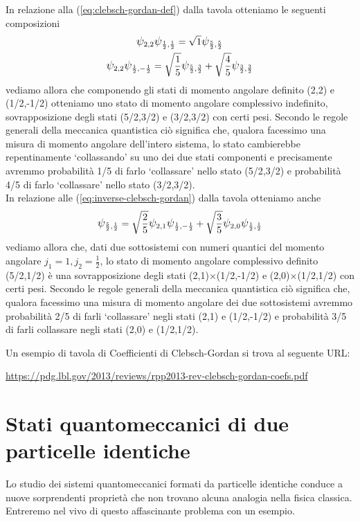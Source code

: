 In relazione alla (\ref{eq:clebsch-gordan-def}) dalla tavola otteniamo le seguenti composizioni
\begin{gather*}
    \mathlarger{\psi}_{2,2}\mathlarger{\psi}_{\frac{1}{2}, \frac{1}{2}} = \sqrt{ 1 } \mathlarger{\psi}_{\frac{5}{2}, \frac{5}{2}}\\
    \mathlarger{\psi}_{2,2}\mathlarger{\psi}_{\frac{1}{2},- \frac{1}{2}} = \sqrt{ \frac{1}{5} } \mathlarger{\psi}_{\frac{5}{2}, \frac{3}{2}} + \sqrt{ \frac{4}{5} } \mathlarger{\psi}_{\frac{3}{2}, \frac{3}{2}}
\end{gather*}
vediamo allora che componendo gli stati di momento angolare definito (2,2) e (1/2,-1/2) otteniamo uno stato di momento angolare complessivo indefinito, sovrapposizione degli stati (5/2,3/2) e (3/2,3/2) con certi pesi.
Secondo le regole generali della meccanica quantistica ciò significa che, qualora facessimo una misura di momento angolare dell’intero sistema,
lo stato cambierebbe repentinamente ‘collassando’ su uno dei due stati componenti e precisamente avremmo probabilità 1/5 di
farlo ‘collassare’ nello stato (5/2,3/2) e probabilità 4/5 di farlo ‘collassare’ nello stato (3/2,3/2). \\
In relazione alle (\ref{eq:inverse-clebsch-gordan}) dalla tavola otteniamo anche
\[
\mathlarger{\psi}_{\frac{5}{2}, \frac{1}{2}} = \sqrt{ \frac{2}{5} } \mathlarger{\psi}_{2,1}\mathlarger{\psi}_{\frac{1}{2}, - \frac{1}{2}} + \sqrt{ \frac{3}{5} } \mathlarger{\psi}_{2,0}\mathlarger{\psi}_{\frac{1}{2}, \frac{1}{2}}
\]
vediamo allora che, dati due sottosistemi con numeri quantici del momento angolare $j_{1}=1, j_{2}=\frac{1}{2}$, lo stato di momento angolare complessivo definito (5/2,1/2) è una sovrapposizione degli stati (2,1)$\times$(1/2,-1/2) e (2,0)$\times$(1/2,1/2) con certi pesi.
Secondo le regole generali della meccanica quantistica ciò significa che, qualora facessimo una misura di momento angolare dei due sottosistemi avremmo probabilità 2/5 di farli ‘collassare’ negli stati (2,1) e (1/2,-1/2) e probabilità 3/5 di farli collassare negli stati (2,0) e (1/2,1/2).
\bigskip

Un esempio di tavola di Coefficienti di Clebsch-Gordan si trova al seguente URL:
\begin{center}
    \url{https://pdg.lbl.gov/2013/reviews/rpp2013-rev-clebsch-gordan-coefs.pdf}
\end{center}

\section{Stati quantomeccanici di due particelle identiche}\label{sec:particelle-identiche}
Lo studio dei sistemi quantomeccanici formati da particelle identiche conduce a nuove sorprendenti proprietà che non trovano alcuna analogia nella fisica classica. Entreremo nel vivo di questo affascinante problema con un esempio.
\bigskip


